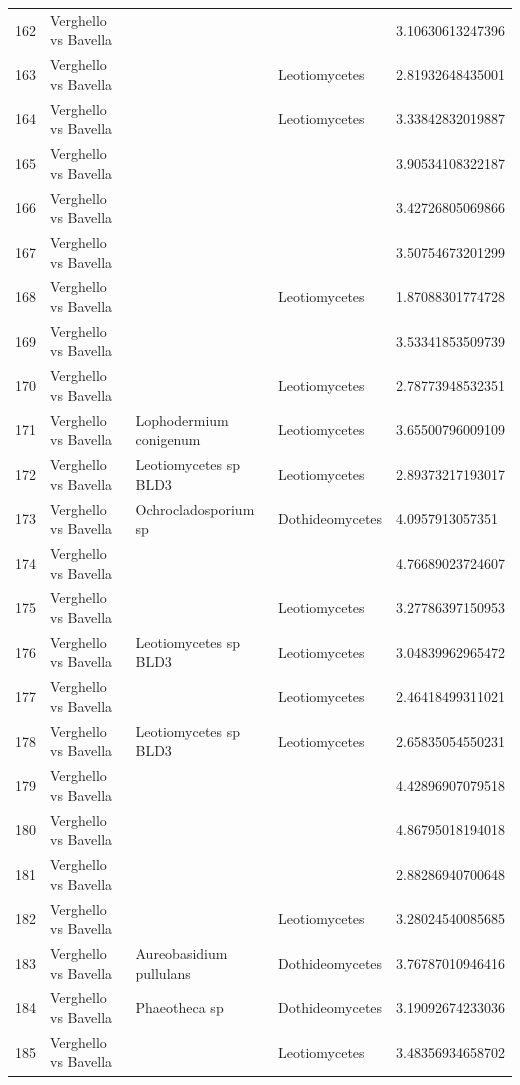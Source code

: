\documentclass[12pt]{article}\usepackage[]{graphicx}\usepackage[]{color}
\numberwithin{figure}{section}
\begin{document}
\begin{table}[ht]
\begin{tabular}{lllll}
  162 & Verghello vs Bavella &  &  & 3.10630613247396 \\ 
  163 & Verghello vs Bavella &  & Leotiomycetes & 2.81932648435001 \\ 
  164 & Verghello vs Bavella &  & Leotiomycetes & 3.33842832019887 \\ 
  165 & Verghello vs Bavella &  &  & 3.90534108322187 \\ 
  166 & Verghello vs Bavella &  &  & 3.42726805069866 \\ 
  167 & Verghello vs Bavella &  &  & 3.50754673201299 \\ 
  168 & Verghello vs Bavella &  & Leotiomycetes & 1.87088301774728 \\ 
  169 & Verghello vs Bavella &  &  & 3.53341853509739 \\ 
  170 & Verghello vs Bavella &  & Leotiomycetes & 2.78773948532351 \\ 
  171 & Verghello vs Bavella & Lophodermium conigenum & Leotiomycetes & 3.65500796009109 \\ 
  172 & Verghello vs Bavella & Leotiomycetes sp BLD3 & Leotiomycetes & 2.89373217193017 \\ 
  173 & Verghello vs Bavella & Ochrocladosporium sp & Dothideomycetes & 4.0957913057351 \\ 
  174 & Verghello vs Bavella &  &  & 4.76689023724607 \\ 
  175 & Verghello vs Bavella &  & Leotiomycetes & 3.27786397150953 \\ 
  176 & Verghello vs Bavella & Leotiomycetes sp BLD3 & Leotiomycetes & 3.04839962965472 \\ 
  177 & Verghello vs Bavella &  & Leotiomycetes & 2.46418499311021 \\ 
  178 & Verghello vs Bavella & Leotiomycetes sp BLD3 & Leotiomycetes & 2.65835054550231 \\ 
  179 & Verghello vs Bavella &  &  & 4.42896907079518 \\ 
  180 & Verghello vs Bavella &  &  & 4.86795018194018 \\ 
  181 & Verghello vs Bavella &  &  & 2.88286940700648 \\ 
  182 & Verghello vs Bavella &  & Leotiomycetes & 3.28024540085685 \\ 
  183 & Verghello vs Bavella & Aureobasidium pullulans & Dothideomycetes & 3.76787010946416 \\ 
  184 & Verghello vs Bavella & Phaeotheca sp & Dothideomycetes & 3.19092674233036 \\ 
  185 & Verghello vs Bavella &  & Leotiomycetes & 3.48356934658702 \\ 

\end{tabular}
\end{table}
\end{document}
